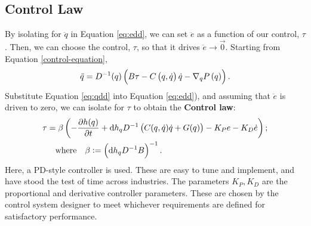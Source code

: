 \documentclass[main.tex]{subfiles}
\begin{document}
    \subsection{Control Law}
    By isolating for $\ddot{ q}$ in Equation \ref{eq:edd}, we can set $\ddot{{e}}$ as a function of our control, $\tau$. Then, we can choose the control, $\tau$, so that it drives $\ddot{{e}}\to \vec{0}$. Starting from Equation \ref{control-equation},
    \begin{align}
        \ddot{{q}}=D\inv({q})\del{B{\tau}
        -C\del[1]{ q,\qd}\qd-\nabla_qP\del{ q}}.\label{eq:qdd}
    \end{align}
    Substitute Equation \ref{eq:qdd} into Equation \ref{eq:edd}), and assuming that $\ddot{{e}}$ is driven to zero, we can isolate for ${\tau}$ to obtain the \textbf{Control law}:
    \begin{align}
    \begin{aligned}
        {\tau}&=\beta\del{-\pdv{h(q)}{t}+\dhq
        D\inv\del{C(q,\qd)\qd+G(q)}-K_Pe-K_D\dot{e}};\\
        &\qq{where}\beta:=\del{\dhq D\inv B}\inv.
    \end{aligned}\label{eq:controllaw}
    \end{align}
Here, a PD-style controller is used. These are easy to tune and implement, and have stood the test of time across industries\cite{franklin2002feedback}.
The parameters $K_P,K_D$ are the proportional and derivative controller parameters. These are chosen by the control system designer to meet whichever requirements are defined for satisfactory performance.
\end{document}

